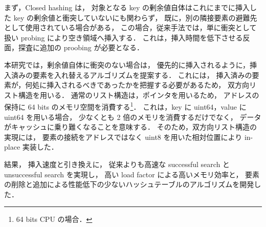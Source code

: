 まず，Closed hashing は，
対象となる key の剰余値自体はこれにまでに挿入した key の剰余値と衝突していないにも関わらず，
既に，別の隣接要素の避難先として使用されている場合がある，
この場合，従来手法では，単に衝突として扱い probing により空き領域へ挿入する．
これは，挿入時間を低下させる反面，探査に追加の proobing が必要となる．

本研究では，剰余値自体に衝突のない場合は，
優先的に挿入されるように，挿入済みの要素を入れ替えるアルゴリズムを提案する．
これには，
挿入済みの要素が，何処に挿入されるべきであったかを把握する必要があるため，
双方向リスト構造を用いる．
通常のリスト構造は，ポインタを用いるため，
アドレスの保持に 64 bits のメモリ空間を消費する\footnote{64 bits CPU の場合．}．
これは，key に uint64，value に uint64 を用いる場合，
少なくとも 2 倍のメモリを消費するだけでなく，
データがキャッシュに乗り難くなることを意味する．
そのため，双方向リスト構造の実現には，
要素の接続をアドレスではなく uint8 を用いた相対位置により in-place 実装した．

結果，
挿入速度と引き換えに，
従来よりも高速な successful search と unsuccessful search を実現し，
高い load factor による高いメモリ効率と，
要素の削除と追加による性能低下の少ないハッシュテーブルのアルゴリズムを開発した．






